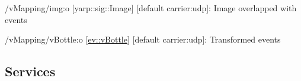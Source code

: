 \begin{DoxyItemize}
\item /v\+Mapping/img\+:o \mbox{[}yarp\+::sig\+::\+Image\mbox{]} \mbox{[}default carrier\+:udp\mbox{]}\+: Image overlapped with events
\item /v\+Mapping/v\+Bottle\+:o \mbox{[}\hyperlink{classev_1_1vBottle}{ev\+::v\+Bottle}\mbox{]} \mbox{[}default carrier\+:udp\mbox{]}\+: Transformed events
\end{DoxyItemize}\hypertarget{group__zynqGrabber_services_sec}{}\subsection{Services}\label{group__zynqGrabber_services_sec}
